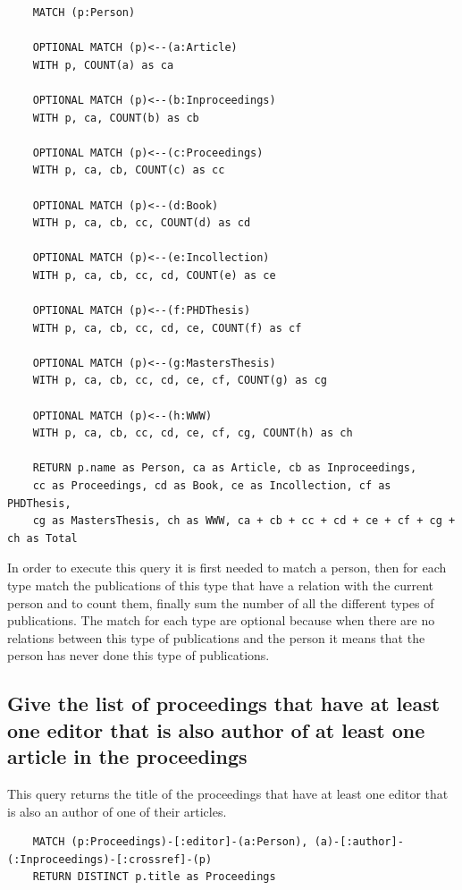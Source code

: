 \documentclass{article}
\begin{document}
\begin{lstlisting}
    MATCH (p:Person)

    OPTIONAL MATCH (p)<--(a:Article)
    WITH p, COUNT(a) as ca
    
    OPTIONAL MATCH (p)<--(b:Inproceedings)
    WITH p, ca, COUNT(b) as cb
    
    OPTIONAL MATCH (p)<--(c:Proceedings)
    WITH p, ca, cb, COUNT(c) as cc
    
    OPTIONAL MATCH (p)<--(d:Book)
    WITH p, ca, cb, cc, COUNT(d) as cd
    
    OPTIONAL MATCH (p)<--(e:Incollection)
    WITH p, ca, cb, cc, cd, COUNT(e) as ce
    
    OPTIONAL MATCH (p)<--(f:PHDThesis)
    WITH p, ca, cb, cc, cd, ce, COUNT(f) as cf
    
    OPTIONAL MATCH (p)<--(g:MastersThesis)
    WITH p, ca, cb, cc, cd, ce, cf, COUNT(g) as cg
    
    OPTIONAL MATCH (p)<--(h:WWW)
    WITH p, ca, cb, cc, cd, ce, cf, cg, COUNT(h) as ch
    
    RETURN p.name as Person, ca as Article, cb as Inproceedings,
    cc as Proceedings, cd as Book, ce as Incollection, cf as PHDThesis,
    cg as MastersThesis, ch as WWW, ca + cb + cc + cd + ce + cf + cg + ch as Total
\end{lstlisting}

In order to execute this query it is first needed to match a person, then for each type match the publications of this type that have a relation with the current person and to count them, finally sum the number of all the different types of publications. The match for each type are optional because when there are no relations between this type of publications and the person it means that the person has never done this type of publications.

\subsection{Give the list of proceedings that have at least one editor that is also author of at least one article in the proceedings}
This query returns the title of the proceedings that have at least one editor that is also an author of one of their articles.

\begin{lstlisting}
    MATCH (p:Proceedings)-[:editor]-(a:Person), (a)-[:author]-(:Inproceedings)-[:crossref]-(p)
    RETURN DISTINCT p.title as Proceedings
\end{lstlisting}
\end{document}
